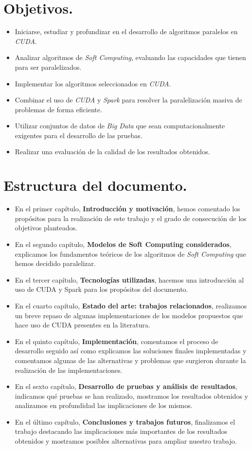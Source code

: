 \documentclass[a4paper,oneside,11pt,titlepage]{book}
\begin{document}
\section{Objetivos.}
\begin{itemize}
    \item Iniciarse, estudiar y profundizar en el desarrollo de algoritmos paralelos en \textit{CUDA}.
    \item Analizar algoritmos de \textit{Soft Computing}, evaluando las capacidades que tienen para ser paralelizados.
    \item Implementar los algoritmos seleccionados en \textit{CUDA}.
    \item Combinar el uso de \textit{CUDA} y \textit{Spark} para resolver la paralelización masiva de problemas de forma eficiente.
    \item Utilizar conjuntos de datos de \textit{Big Data} que sean computacionalmente exigentes para el desarrollo de las pruebas.
    \item Realizar una evaluación de la calidad de los resultados obtenidos.
\end{itemize}

\section{Estructura del documento.}

\begin{itemize}
    \item En el primer capítulo, \textbf{Introducción y motivación}, hemos comentado los propósitos para la realización de este trabajo y el grado de consecución de los objetivos planteados.
    \item En el segundo capítulo, \textbf{Modelos de Soft Computing considerados}, explicamos los fundamentos teóricos de los algoritmos de \textit{Soft Computing} que hemos decidido paralelizar.
    \item En el tercer capítulo, \textbf{Tecnologías utilizadas}, hacemos una introducción al uso de CUDA y Spark para los propósitos del documento.
    \item En el cuarto capítulo, \textbf{Estado del arte: trabajos relacionados}, realizamos un breve repaso de algunas implementaciones de los modelos propuestos que hace uso de CUDA presentes en la literatura.
    \item En el quinto capítulo, \textbf{Implementación}, comentamos el proceso de desarrollo seguido así como explicamos las soluciones finales implementadas y comentamos algunas de las alternativas y problemas que surgieron durante la realización de las implementaciones.
    \item En el sexto capítulo, \textbf{Desarrollo de pruebas y análisis de resultados}, indicamos qué pruebas se han realizado, mostramos los resultados obtenidos y analizamos en profundidad las implicaciones de los mismos.
    \item En el último capítulo, \textbf{Conclusiones y trabajos futuros}, finalizamos el trabajo destacando las implicaciones más importantes de los resultados obtenidos y mostramos posibles alternativas para ampliar nuestro trabajo.
\end{itemize}
\end{document}
